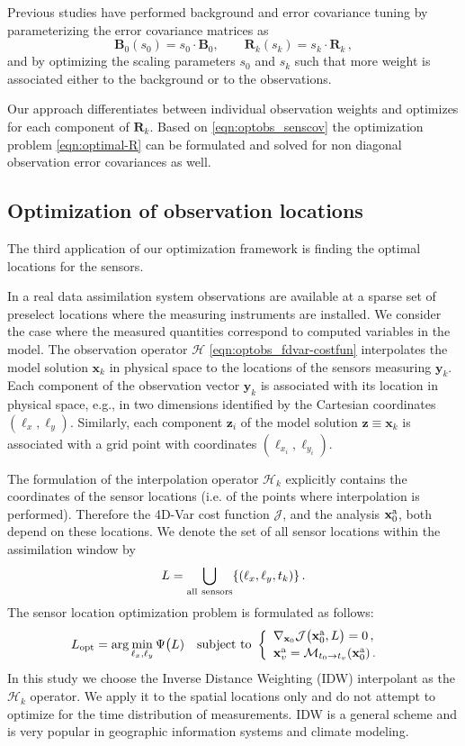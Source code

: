 \documentclass{article}
\newcommand{\Jfunc}{\mathcal J }
\newcommand{\Model}{\mathcal M}
\newcommand{\B}{\mathbf{B}}
\newcommand{\R}{\mathbf{R}}
\newcommand{\x}{   \mathbf{x} }
\newcommand{\xa}{ \mathbf{x}^{\rm a} }
\newcommand{\y}{ \mathbf{y} }
\newcommand{\z}{ \mathbf{z} }
\renewcommand{\H}{\mathcal{H}}
\begin{document}
Previous studies  \cite{Daescu_2010} have performed background and error covariance tuning by 
parameterizing the error covariance matrices as
\[
 \B_0(s_0) = s_0 \cdot \B_0, \qquad \R_k(s_k) = s_k \cdot \R_k\,,
\]
and by optimizing the scaling parameters $s_0$ and $s_k$ such that more weight
is associated either to the background  or to the observations.

Our approach differentiates between individual observation weights
and optimizes for each component of $\R_k$. Based on \eqref{eqn:optobs_senscov}
the optimization problem \eqref{eqn:optimal-R} can be formulated and solved for
non diagonal observation error covariances as well. 


\subsection{Optimization of observation locations}\label{sec:optimize-locations}


The third application of our optimization framework is finding the optimal locations for the sensors.

In a real data assimilation system observations are available at a sparse set of preselect locations where the measuring instruments are installed.
We consider the case where the measured quantities correspond to computed variables in the model.
The observation operator $\H$ \eqref{eqn:optobs_fdvar-costfun} interpolates the model solution $\x_k$ in physical space to the locations of 
the sensors measuring $\y_k$.
Each component of the observation vector $\y_k$ is associated with its location in physical space, e.g., in two dimensions
identified by the Cartesian coordinates $(\ell_x,\ell_y)$.
Similarly, each component  $\z_i$ of the model solution $\z \equiv \x_k$ is associated with a grid point with coordinates  $(\ell_{x_i},\ell_{y_i})$. 

The formulation of the interpolation operator $\H_k$ explicitly contains the coordinates of the sensor locations
(i.e. of the points where interpolation is performed). Therefore the 4D-Var cost function $\Jfunc$, and the analysis $\xa_0$, both depend on these locations.
We denote the set of all sensor locations within the assimilation window by 
\[
L = \bigcup_{\rm all~sensors} \{(\ell_x,\ell_y,t_k)\}\,.
\]
The sensor location optimization problem is formulated as follows: 
\begin{align}
 \label{eqn:optimal-loc}
 L_\textrm{opt} &= \arg\min_{\ell_x,\ell_y} \Psi\bigl(L) \quad \textnormal{subject to }
 \left\{ 
 \begin{array}{l}
 \nabla_{\x_0} \Jfunc\bigl(\xa_0,L\bigr) = 0\,, \\[2pt]
 \xa_v = \Model_{t_0 \rightarrow t_v} (\xa_0)\,.
 \end{array}
 \right. 
\end{align}
In this study we choose the Inverse Distance Weighting (IDW) \cite{shepard1968two} interpolant as the $\H_k$ operator.
We apply it to the spatial locations only and do not attempt to optimize for the time distribution of measurements.
IDW is a general scheme and is very popular in geographic information systems and climate modeling. 
\end{document}
